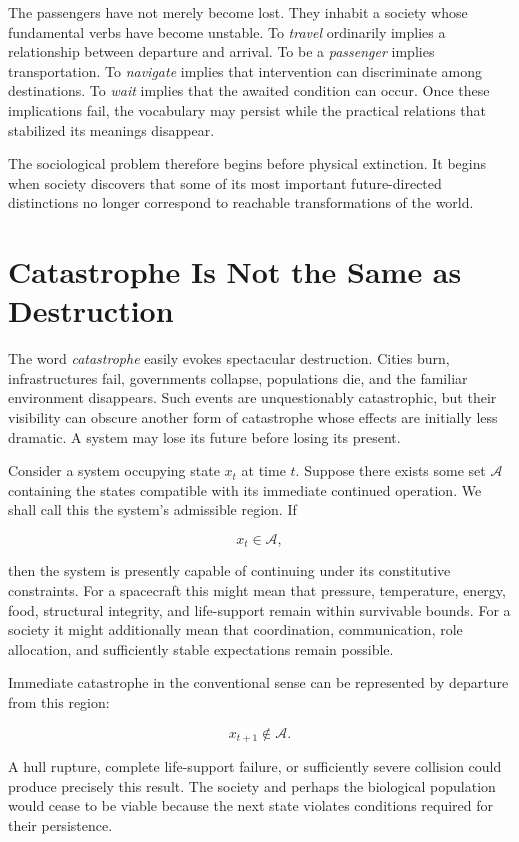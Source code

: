 \documentclass[11pt,oneside]{book}
\theoremstyle{definition}
\theoremstyle{remark}
\newcommand{\A}{\mathcal{A}}
\begin{document}
The passengers have not merely become lost. They inhabit a society whose fundamental verbs have become unstable. To \emph{travel} ordinarily implies a relationship between departure and arrival. To be a \emph{passenger} implies transportation. To \emph{navigate} implies that intervention can discriminate among destinations. To \emph{wait} implies that the awaited condition can occur. Once these implications fail, the vocabulary may persist while the practical relations that stabilized its meanings disappear.

The sociological problem therefore begins before physical extinction. It begins when society discovers that some of its most important future-directed distinctions no longer correspond to reachable transformations of the world.

\section{Catastrophe Is Not the Same as Destruction}

The word \emph{catastrophe} easily evokes spectacular destruction. Cities burn, infrastructures fail, governments collapse, populations die, and the familiar environment disappears. Such events are unquestionably catastrophic, but their visibility can obscure another form of catastrophe whose effects are initially less dramatic. A system may lose its future before losing its present.

Consider a system occupying state \(x_t\) at time \(t\). Suppose there exists some set \(\A\) containing the states compatible with its immediate continued operation. We shall call this the system's admissible region. If

\[
x_t \in \A,
\]

then the system is presently capable of continuing under its constitutive constraints. For a spacecraft this might mean that pressure, temperature, energy, food, structural integrity, and life-support remain within survivable bounds. For a society it might additionally mean that coordination, communication, role allocation, and sufficiently stable expectations remain possible.

Immediate catastrophe in the conventional sense can be represented by departure from this region:

\[
x_{t+1} \notin \A.
\]

A hull rupture, complete life-support failure, or sufficiently severe collision could produce precisely this result. The society and perhaps the biological population would cease to be viable because the next state violates conditions required for their persistence.
\end{document}
